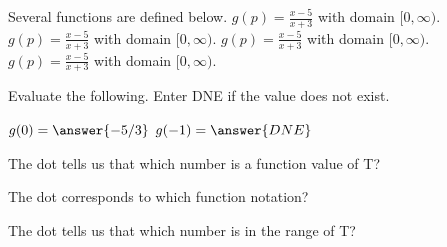 \documentclass{ximera}
\begin{document}
\begin{definition}
Several functions are defined below.
$g(p) = \frac{x-5}{x+3}$ with domain $[0, \infty)$.
$g(p) = \frac{x-5}{x+3}$ with domain $[0, \infty)$.
$g(p) = \frac{x-5}{x+3}$ with domain $[0, \infty)$.
$g(p) = \frac{x-5}{x+3}$ with domain $[0, \infty)$.

\end{definition}



\begin{exercise}
Evaluate the following.  Enter DNE if the value does not exist.

$g(0) = \answer{-5/3}$
$g(-1) = \answer{DNE}$


\end{exercise}






\begin{exercise}
The dot tells us that which number is a function value of T?

\begin{selectAll}
\end{selectAll}

\end{exercise}




\begin{exercise}
The dot corresponds to which function notation? 

\begin{selectAll}
\end{selectAll}

\end{exercise}





\begin{exercise}
The dot tells us that which number is in the range of T?

\begin{selectAll}
\end{selectAll}

\end{exercise}
\end{document}

